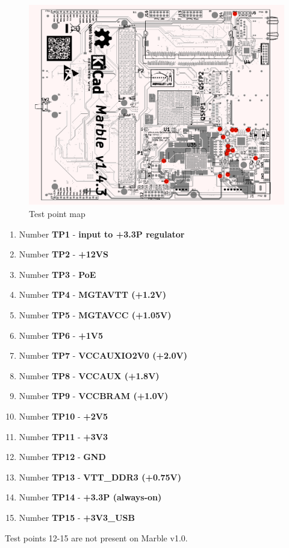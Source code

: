 \documentclass[12pt,oneside,a4]{article}
\begin{document}
\begin{figure}[H]
\begin{center}
\includegraphics[width=1\linewidth]{testpoint_map.pdf}
 \caption{Test point map}\label{testpoints}
\end{center}
\end{figure}

\begin{enumerate}[label=(\alph*)]
	\item Number \textbf{TP1} - \textbf{input to +3.3P regulator}
	\item Number \textbf{TP2} - \textbf{+12VS}
	\item Number \textbf{TP3} - \textbf{PoE}
	\item Number \textbf{TP4} - \textbf{MGTAVTT (+1.2V)}
	\item Number \textbf{TP5} - \textbf{MGTAVCC (+1.05V)}
	\item Number \textbf{TP6} - \textbf{+1V5}
	\item Number \textbf{TP7} - \textbf{VCCAUXIO2V0 (+2.0V)}
	\item Number \textbf{TP8} - \textbf{VCCAUX (+1.8V)}
	\item Number \textbf{TP9} - \textbf{VCCBRAM (+1.0V)}
	\item Number \textbf{TP10} - \textbf{+2V5}
	\item Number \textbf{TP11} - \textbf{+3V3}
	\item Number \textbf{TP12} - \textbf{GND}
	\item Number \textbf{TP13} - \textbf{VTT\_DDR3 (+0.75V)}
	\item Number \textbf{TP14} - \textbf{+3.3P (always-on)}
	\item Number \textbf{TP15} - \textbf{+3V3\_USB}

\end{enumerate}

Test points 12-15 are not present on Marble v1.0.

\begin{thebibliography}{99}
\end{thebibliography}
\end{document}
